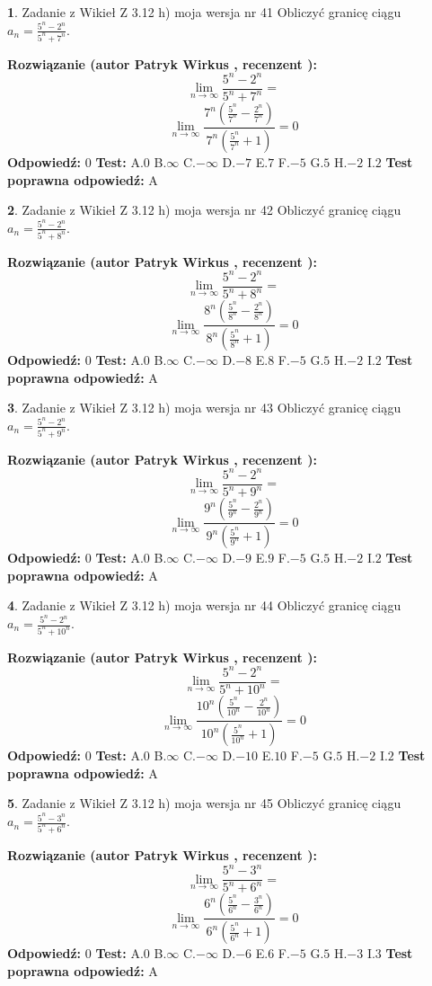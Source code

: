 \documentclass[12pt, a4paper]{article}
\theoremstyle{definition} %
\newtheorem{zad}{}
\newcommand{\zadStart}[1]{\begin{zad}#1\newline}
\newcommand{\zadStop}{\end{zad}}
\newcommand{\rozwStart}[2]{\noindent \textbf{Rozwiązanie (autor #1 , recenzent #2): }\newline}
\newcommand{\rozwStop}{\newline}
\newcommand{\odpStart}{\noindent \textbf{Odpowiedź:}\newline}
\newcommand{\odpStop}{\newline}
\newcommand{\testStart}{\noindent \textbf{Test:}\newline}
\newcommand{\testStop}{\newline}
\newcommand{\kluczStart}{\noindent \textbf{Test poprawna odpowiedź:}\newline}
\newcommand{\kluczStop}{\newline}
\begin{document}
\zadStart{Zadanie z Wikieł Z 3.12 h) moja wersja nr 41}
Obliczyć granicę ciągu $a_{n}=\frac{5^{n} - 2^{n}}{5^{n} + 7^{n}}$.
\zadStop
\rozwStart{Patryk Wirkus}{}
$$\lim\limits_{n\to\infty}\frac{5^{n} - 2^{n}}{5^{n} + 7^{n}}=$$
$$\lim\limits_{n\to\infty}\frac{7^{n}(\frac{5^{n}}{7^{n}} - \frac{2^{n}}{7^{n}})}{7^{n}(\frac{5^{n}}{7^{n}} + 1)} = 0$$
\rozwStop
\odpStart
$0$
\odpStop
\testStart
A.$0$
B.$\infty$
C.$-\infty$
D.$-7$
E.$7$
F.$-5$
G.$5$
H.$-2$
I.$2$
\testStop
\kluczStart
A
\kluczStop



\zadStart{Zadanie z Wikieł Z 3.12 h) moja wersja nr 42}
Obliczyć granicę ciągu $a_{n}=\frac{5^{n} - 2^{n}}{5^{n} + 8^{n}}$.
\zadStop
\rozwStart{Patryk Wirkus}{}
$$\lim\limits_{n\to\infty}\frac{5^{n} - 2^{n}}{5^{n} + 8^{n}}=$$
$$\lim\limits_{n\to\infty}\frac{8^{n}(\frac{5^{n}}{8^{n}} - \frac{2^{n}}{8^{n}})}{8^{n}(\frac{5^{n}}{8^{n}} + 1)} = 0$$
\rozwStop
\odpStart
$0$
\odpStop
\testStart
A.$0$
B.$\infty$
C.$-\infty$
D.$-8$
E.$8$
F.$-5$
G.$5$
H.$-2$
I.$2$
\testStop
\kluczStart
A
\kluczStop



\zadStart{Zadanie z Wikieł Z 3.12 h) moja wersja nr 43}
Obliczyć granicę ciągu $a_{n}=\frac{5^{n} - 2^{n}}{5^{n} + 9^{n}}$.
\zadStop
\rozwStart{Patryk Wirkus}{}
$$\lim\limits_{n\to\infty}\frac{5^{n} - 2^{n}}{5^{n} + 9^{n}}=$$
$$\lim\limits_{n\to\infty}\frac{9^{n}(\frac{5^{n}}{9^{n}} - \frac{2^{n}}{9^{n}})}{9^{n}(\frac{5^{n}}{9^{n}} + 1)} = 0$$
\rozwStop
\odpStart
$0$
\odpStop
\testStart
A.$0$
B.$\infty$
C.$-\infty$
D.$-9$
E.$9$
F.$-5$
G.$5$
H.$-2$
I.$2$
\testStop
\kluczStart
A
\kluczStop



\zadStart{Zadanie z Wikieł Z 3.12 h) moja wersja nr 44}
Obliczyć granicę ciągu $a_{n}=\frac{5^{n} - 2^{n}}{5^{n} + 10^{n}}$.
\zadStop
\rozwStart{Patryk Wirkus}{}
$$\lim\limits_{n\to\infty}\frac{5^{n} - 2^{n}}{5^{n} + 10^{n}}=$$
$$\lim\limits_{n\to\infty}\frac{10^{n}(\frac{5^{n}}{10^{n}} - \frac{2^{n}}{10^{n}})}{10^{n}(\frac{5^{n}}{10^{n}} + 1)} = 0$$
\rozwStop
\odpStart
$0$
\odpStop
\testStart
A.$0$
B.$\infty$
C.$-\infty$
D.$-10$
E.$10$
F.$-5$
G.$5$
H.$-2$
I.$2$
\testStop
\kluczStart
A
\kluczStop



\zadStart{Zadanie z Wikieł Z 3.12 h) moja wersja nr 45}
Obliczyć granicę ciągu $a_{n}=\frac{5^{n} - 3^{n}}{5^{n} + 6^{n}}$.
\zadStop
\rozwStart{Patryk Wirkus}{}
$$\lim\limits_{n\to\infty}\frac{5^{n} - 3^{n}}{5^{n} + 6^{n}}=$$
$$\lim\limits_{n\to\infty}\frac{6^{n}(\frac{5^{n}}{6^{n}} - \frac{3^{n}}{6^{n}})}{6^{n}(\frac{5^{n}}{6^{n}} + 1)} = 0$$
\rozwStop
\odpStart
$0$
\odpStop
\testStart
A.$0$
B.$\infty$
C.$-\infty$
D.$-6$
E.$6$
F.$-5$
G.$5$
H.$-3$
I.$3$
\testStop
\kluczStart
A
\kluczStop
\end{document}
